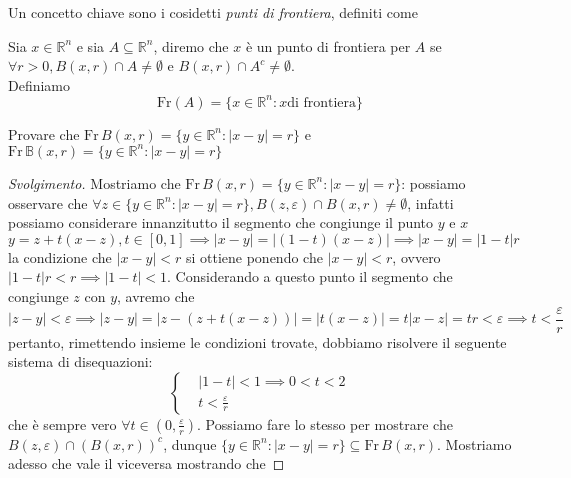 Un concetto chiave sono i cosidetti \emph{punti di frontiera}, definiti come
\begin{definition}
	Sia $x \in \mathbb{R}^n$ e sia $A \subseteq \mathbb{R}^n$, diremo che $x$ è un punto di frontiera per $A$ se $\forall r > 0, B(x, r) \cap A \neq \emptyset$ e $B(x, r) \cap A^c \neq \emptyset$. \\
	Definiamo
	$$
	\text{Fr}(A)=\{x \in \mathbb{R}^n : x \text{di frontiera} \}
	$$
\end{definition}
\begin{exercise}
	Provare che $\text{Fr} \, B(x, r) = \{y \in \mathbb{R}^n : |x-y| = r \}$ e $\text{Fr} \, \mathbb{B}(x, r) = \{y \in \mathbb{R}^n : |x-y| = r \}$
\end{exercise}
\begin{proof}[Svolgimento]
	Mostriamo che $\text{Fr} \, B(x, r) = \{y \in \mathbb{R}^n : |x-y| = r \}$: %
	possiamo osservare che $\forall z \in \{y \in \mathbb{R}^n : |x-y| = r \}, B(z, \varepsilon) \cap B(x, r) \neq \emptyset$, infatti possiamo considerare innanzitutto il segmento che congiunge il punto $y$ e $x$
	$$
	y = z + t(x-z), t \in [0, 1] \implies |x-y| = |(1-t)(x-z)| \implies |x-y| = |1-t|r
	$$
	la condizione che $|x-y|<r$ si ottiene ponendo che $|x-y| < r$, ovvero $|1-t| r < r \implies |1-t| < 1$. Considerando a questo punto il segmento che congiunge $z$ con $y$, avremo che
	$$
	|z-y| < \varepsilon \implies |z-y| = |z-(z+t(x-z))| = |t(x-z)| = t|x-z| = tr < \varepsilon \implies t < \frac{\varepsilon}{r} 
	$$
	pertanto, rimettendo insieme le condizioni trovate, dobbiamo risolvere il seguente sistema di disequazioni:
	\begin{equation*}
		\begin{cases}
			&|1-t| < 1 \implies 0 < t < 2 \\
			&t < \frac{\varepsilon}{r}
		\end{cases}
	\end{equation*}
	che è sempre vero $\forall t \in (0, \frac{\varepsilon}{r})$. Possiamo fare lo stesso per mostrare che $B(z, \varepsilon) \cap (B(x, r))^c$, dunque $\{y \in \mathbb{R}^n: |x-y| = r \} \subseteq \text{Fr} \, B(x, r)$. Mostriamo adesso che vale il viceversa mostrando che 

\end{proof}
